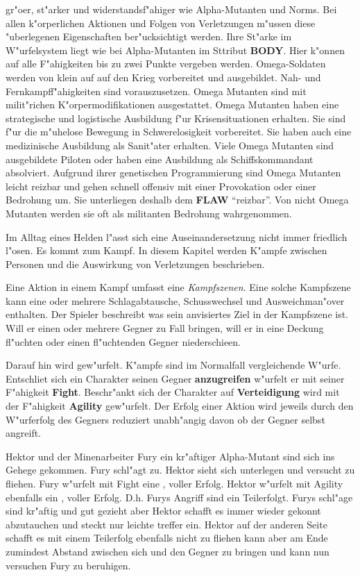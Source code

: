 \begin{description}
        gr"o\3er, st"arker und widerstandsf"ahiger wie Alpha-Mutanten und Norms. Bei allen k"orperlichen Aktionen und Folgen von Verletzungen m"ussen diese "uberlegenen Eigenschaften ber"ucksichtigt werden. Ihre St"arke im W"urfelsystem liegt wie bei Alpha-Mutanten im Sttribut \textbf{BODY}. Hier k"onnen auf alle F"ahigkeiten bis zu zwei Punkte vergeben werden. Omega-Soldaten werden von klein auf auf den Krieg vorbereitet und ausgebildet. Nah- und Fernkampff"ahigkeiten sind vorauszusetzen. Omega Mutanten sind mit milit"richen K"orpermodifikationen ausgestattet. Omega Mutanten haben eine strategische und logistische Ausbildung f"ur Krisensituationen erhalten. Sie sind f"ur die m"uhelose Bewegung in Schwerelosigkeit vorbereitet. Sie haben auch eine medizinische Ausbildung als Sanit"ater erhalten. Viele Omega Mutanten sind ausgebildete Piloten oder haben eine Ausbildung als Schiffskommandant absolviert. Aufgrund ihrer genetischen Programmierung sind Omega Mutanten leicht reizbar und gehen schnell offensiv mit einer Provokation oder einer Bedrohung um. Sie unterliegen deshalb dem \textbf{FLAW} "`reizbar"'. Von nicht Omega Mutanten werden sie oft als militanten Bedrohung wahrgenommen.
\end{description}

Im Alltag eines Helden l"asst sich eine Auseinandersetzung nicht immer friedlich l"osen. Es kommt zum Kampf. In diesem Kapitel werden K"ampfe zwischen Personen und die Auswirkung von Verletzungen beschrieben.

Eine Aktion in einem Kampf umfasst eine \emph{Kampfszenen}. Eine solche Kampfszene kann eine oder mehrere Schlagabtausche, Schusswechsel und Ausweichman"over enthalten. Der Spieler beschreibt was sein anvisiertes Ziel in der Kampfszene ist. Will er einen oder mehrere Gegner zu Fall bringen, will er in eine Deckung fl"uchten oder einen fl"uchtenden Gegner niederschie\3en. 

Darauf hin wird gew"urfelt. K"ampfe sind im Normalfall vergleichende W"urfe. Entschlie\3t sich ein Charakter seinen Gegner \textbf{anzugreifen} w"urfelt er mit seiner F"ahigkeit \textbf{Fight}. Beschr"ankt sich der Charakter auf \textbf{Verteidigung} wird mit der F"ahigkeit \textbf{Agility} gew"urfelt. Der Erfolg einer Aktion wird jeweils durch den W"urferfolg des Gegners reduziert unabh"angig davon ob der Gegner selbst angreift.

\begin{ruleexample}
    Hektor und der Minenarbeiter Fury ein kr"aftiger Alpha-Mutant sind sich ins Gehege gekommen. Fury schl"agt zu. Hektor sieht sich unterlegen und versucht zu fliehen. Fury w"urfelt mit Fight eine , voller Erfolg. Hektor w"urfelt mit Agility ebenfalls ein , voller Erfolg. D.h. Furys Angriff sind ein Teilerfolgt. Furys schl"age sind kr"aftig und gut gezieht aber Hektor schafft es immer wieder gekonnt abzutauchen und steckt nur leichte treffer ein. Hektor auf der anderen Seite schafft es mit einem Teilerfolg ebenfalls nicht zu fliehen kann aber am Ende zumindest Abstand zwischen sich und den Gegner zu bringen und kann nun versuchen Fury zu beruhigen.
\end{ruleexample}

